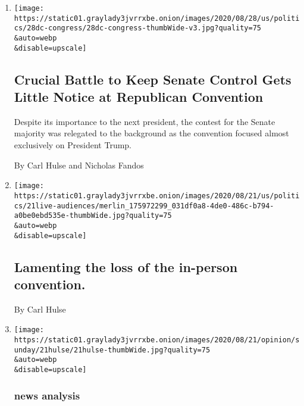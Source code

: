 \begin{enumerate}
\def\labelenumi{\arabic{enumi}.}
\item
  \href{/2020/08/28/us/senate-control-republican-convention-trump.html}{}

  \texttt{[image: https://static01.graylady3jvrrxbe.onion/images/2020/08/28/us/politics/28dc-congress/28dc-congress-thumbWide-v3.jpg?quality=75\\\&auto=webp\\\&disable=upscale]}

  \hypertarget{crucial-battle-to-keep-senate-control-gets-little-notice-at-republican-convention}{%
  \subsection{Crucial Battle to Keep Senate Control Gets Little Notice
  at Republican
  Convention}\label{crucial-battle-to-keep-senate-control-gets-little-notice-at-republican-convention}}

  Despite its importance to the next president, the contest for the
  Senate majority was relegated to the background as the convention
  focused almost exclusively on President Trump.

  By Carl Hulse and Nicholas Fandos
\item
  \href{/2020/08/22/us/elections/lamenting-the-loss-of-the-in-person-convention.html}{}

  \texttt{[image: https://static01.graylady3jvrrxbe.onion/images/2020/08/21/us/politics/21live-audiences/merlin\_175972299\_031df0a8-4de0-486c-b794-a0be0ebd535e-thumbWide.jpg?quality=75\\\&auto=webp\\\&disable=upscale]}

  \hypertarget{lamenting-the-loss-of-the-in-person-convention}{%
  \subsection{Lamenting the loss of the in-person
  convention.}\label{lamenting-the-loss-of-the-in-person-convention}}

  By Carl Hulse
\item
  \href{/2020/08/21/sunday-review/democratic-convention-biden.html}{}

  \texttt{[image: https://static01.graylady3jvrrxbe.onion/images/2020/08/21/opinion/sunday/21hulse/21hulse-thumbWide.jpg?quality=75\\\&auto=webp\\\&disable=upscale]}

  \hypertarget{news-analysis}{%
  \subsubsection{news analysis}\label{news-analysis}}


\end{enumerate}

